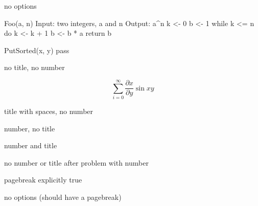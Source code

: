 \documentclass[duedate=2018-99-99, assignment={Problem Set 3},]{problemset}
\author{Rebecca Turner}
\begin{document}
\maketitlepage

\begin{problem}
	no options
\end{problem}

\begin{pseudocode}
Foo(a, n)
	Input:  two integers, a and n
	Output: a^n
	k <- 0
	b <- 1
	while k <= n do
		k <- k + 1
		b <- b * a
	return b

PutSorted(x, y)
	pass
\end{pseudocode}

\begin{problem}[pagebreak=false]
	no title, no number
\end{problem}

\[ \sum_{i = 0}^{\infty} \frac{\partial x}{\partial y} \sin x y \]

\begin{problem}[pagebreak=false, title=Example title]
	title with spaces, no number
\end{problem}

\begin{problem}[pagebreak=false, number=5.3]
	number, no title
\end{problem}

\begin{problem}[pagebreak=false, number=2.3, title=Threads]
	number and title
\end{problem}

\begin{problem}[pagebreak=false]
	no number or title after problem with number
\end{problem}

\begin{problem}[pagebreak=true]
	pagebreak explicitly true
\end{problem}

\begin{problem}
	no options (should have a pagebreak)
\end{problem}
\end{document}
